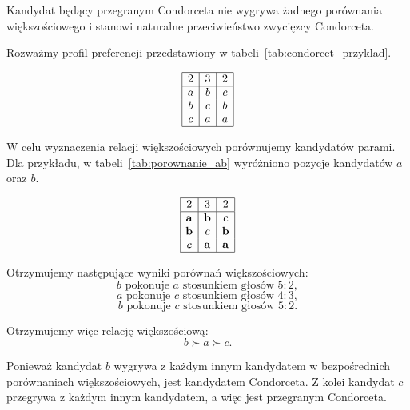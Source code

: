 \documentclass[12pt,a4paper]{mwrep}
\begin{document}
	Kandydat będący przegranym Condorceta nie wygrywa żadnego porównania większościowego i stanowi naturalne przeciwieństwo zwycięzcy Condorceta.
	
	\begin{example}
		Rozważmy profil preferencji przedstawiony w tabeli~\ref{tab:condorcet_przyklad}.
		
		\begin{table}[H]
			\centering
			\[
			\begin{array}{|c|c|c|}
				\hline
				2 & 3 & 2\\
				\hline
				a & b & c\\
				b & c & b\\
				c & a & a\\
				\hline
			\end{array}
			\]
			\caption{Profil preferencji dla trzech kandydatów}
			\label{tab:condorcet_przyklad}
		\end{table}
		
		W celu wyznaczenia relacji większościowych porównujemy kandydatów parami. Dla przykładu, w tabeli~\ref{tab:porownanie_ab} wyróżniono pozycje kandydatów \(a\) oraz \(b\).
		
		\begin{table}[H]
			\centering
			\[
			\begin{array}{|c|c|c|}
				\hline
				2 & 3 & 2\\
				\hline
				\mathbf{a} & \mathbf{b} & c\\
				\mathbf{b} & c & \mathbf{b}\\
				c & \mathbf{a} & \mathbf{a}\\
				\hline
			\end{array}
			\]
			\caption{Porównanie większościowe kandydatów \(a\) i \(b\)}
			\label{tab:porownanie_ab}
		\end{table}
		
		Otrzymujemy następujące wyniki porównań większościowych:
		\[
		b \text{ pokonuje } a \text{ stosunkiem głosów } 5:2,
		\]
		\[
		a \text{ pokonuje } c \text{ stosunkiem głosów } 4:3,
		\]
		\[
		b \text{ pokonuje } c \text{ stosunkiem głosów } 5:2.
		\]
		
		Otrzymujemy więc relację większościową:
		\[
		b \succ a \succ c.
		\]
		
		Ponieważ kandydat \(b\) wygrywa z każdym innym kandydatem w bezpośrednich porównaniach większościowych, jest kandydatem Condorceta. Z kolei kandydat \(c\) przegrywa z każdym innym kandydatem, a więc jest przegranym Condorceta.
	\end{example}
\end{document}
